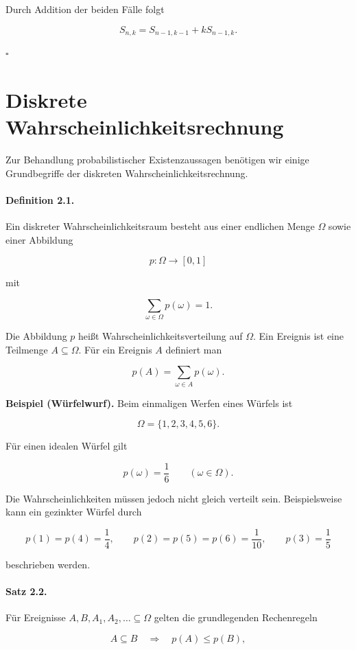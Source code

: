 \documentclass{article}
\begin{document}
Durch Addition der beiden Fälle folgt

\[
S_{n,k}
=
S_{n-1,k-1}
+
kS_{n-1,k}.
\]

\hfill $\square$

\section{Diskrete Wahrscheinlichkeitsrechnung}

Zur Behandlung probabilistischer Existenzaussagen benötigen wir einige Grundbegriffe der diskreten Wahrscheinlichkeitsrechnung.

\paragraph{Definition 2.1.}
Ein diskreter Wahrscheinlichkeitsraum besteht aus einer endlichen Menge
\(\Omega\) sowie einer Abbildung

\[
p:\Omega\to[0,1]
\]

mit

\[
\sum_{\omega\in\Omega} p(\omega)=1.
\]

Die Abbildung \(p\) heißt Wahrscheinlichkeitsverteilung auf \(\Omega\).
Ein Ereignis ist eine Teilmenge \(A\subseteq\Omega\). Für ein Ereignis \(A\)
definiert man

\[
p(A)=\sum_{\omega\in A} p(\omega).
\]

\medskip

\textbf{Beispiel (Würfelwurf).}
Beim einmaligen Werfen eines Würfels ist

\[
\Omega=\{1,2,3,4,5,6\}.
\]

Für einen idealen Würfel gilt

\[
p(\omega)=\frac16
\qquad (\omega\in\Omega).
\]

Die Wahrscheinlichkeiten müssen jedoch nicht gleich verteilt sein. Beispielsweise kann ein gezinkter Würfel durch

\[
p(1)=p(4)=\frac14,\qquad
p(2)=p(5)=p(6)=\frac1{10},\qquad
p(3)=\frac15
\]

beschrieben werden.

\medskip

\paragraph{Satz 2.2.}
Für Ereignisse \(A,B,A_1,A_2,\dots\subseteq\Omega\) gelten die grundlegenden Rechenregeln

\[
A\subseteq B
\quad\Longrightarrow\quad
p(A)\leq p(B),
\]
\end{document}
